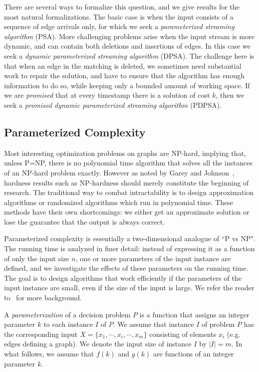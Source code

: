 \documentclass[11pt,letter]{article}
\begin{document}
There are several ways to formalize this question, and we give results for the most natural formalizations.
The basic case is when the input consists of a sequence of edge
arrivals only, for which we seek a {\em parameterized streaming
  algorithm} (PSA).
More challenging problems arise when the input stream is more
dynamic, and can contain both deletions and insertions of edges. In this case we seek a {\em dynamic parameterized streaming
  algorithm} (DPSA).
The challenge here is that when an edge in the matching is deleted, we
sometimes need substantial work to repair the solution, and have to
ensure that the algorithm has enough information to do so, while keeping only a bounded amount of working space. If we are \emph{promised} that at every timestamp there is a solution of cost $k$, then we seek a {\em promised dynamic parameterized streaming
  algorithm} (PDPSA).









\subsection{Parameterized Complexity}

Most interesting optimization problems on graphs are NP-hard,
implying that, unless P=NP, there is no polynomial time algorithm
that solves all the instances of an NP-hard problem exactly.
However as noted by Garey and Johnson~\cite{garey-johnson},
hardness results such as NP-hardness should merely constitute
the beginning of research.
The traditional way to combat  intractability is to design approximation
algorithms or randomized algorithms which run in polynomial time.
These methods have their own shortcomings:
we either get an approximate solution or lose the guarantee that
the output is always correct.


Parameterized complexity is essentially a two-dimensional analogue of ``P
vs NP". The running time is analyzed in finer detail:
instead of expressing it as a function of only the input size $n$, one
or more parameters of the input instance are defined,
and we investigate the effects of these parameters on the running time.
The goal is to design algorithms that work efficiently if
the parameters of the input instance are small, even if the size of
the input is large. We refer the reader to~\cite{DF99, FG06} for more background.

A  \textit{parameterization} of a decision problem  $P$ is a function
that assigns an integer parameter $k$ to each instance $I$ of $P$.
We assume that instance $I$ of problem $P$ has
the corresponding input $X=\{x_1,\cdots,x_i,\cdots, x_m\}$
consisting of elements $x_i$ (e.g. edges defining a graph).
We denote the input size of instance  $I$ by $|I|=m$.
In what follows, we assume that $f(k)$ and $g(k)$ are functions of an
integer parameter $k$.
\end{document}
